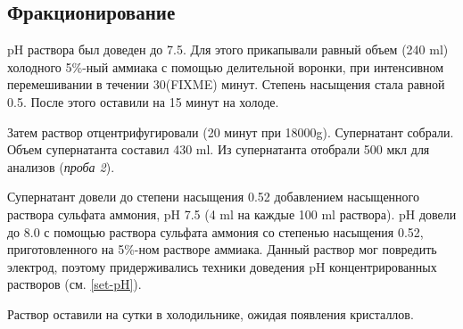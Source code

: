 \subsection{Фракционирование}
\label{2-frac-end}
pH раствора был доведен до 7.5.
Для этого прикапывали равный объем (240 ml) холодного 5\%-ный аммиака
с помощью делительной воронки, при интенсивном перемешивании в течении 30(FIXME) минут.
Степень насыщения стала равной 0.5.
После этого оставили на 15 минут на холоде.

Затем раствор отцентрифугировали (20 минут при 18000g).
Супернатант собрали. Объем супернатанта составил 430 ml.
Из супернатанта отобрали 500 мкл для анализов (\emph{проба 2}).

Супернатант довели до степени насыщения 0.52 добавлением
насыщенного раствора сульфата аммония, pH 7.5 (4 ml  на каждые 100 ml раствора).
pH довели до 8.0 с помощью раствора сульфата аммония со степенью насыщения 0.52,
приготовленного на 5\%-ном растворе аммиака.
Данный раствор мог повредить электрод, поэтому придерживались
техники доведения pH концентрированных растворов (см. \ref{set-pH}).

Раствор оставили на сутки в холодильнике, ожидая появления кристаллов.

